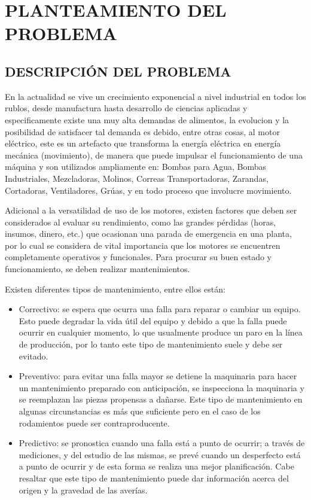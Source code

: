 \thispagestyle{empty}
\setcounter{page}{5}

\section{PLANTEAMIENTO DEL PROBLEMA}

\subsection{DESCRIPCIÓN DEL PROBLEMA}

En la actualidad se vive un crecimiento exponencial a nivel industrial en todos
los rublos, desde manufactura hasta desarrollo de ciencias aplicadas y especificamente
existe una muy alta demandas de alimentos, la evolucion y la posibilidad de
satisfacer tal demanda es debido, entre
otras cosas, al motor eléctrico, este es un artefacto que transforma la
energía eléctrica en energía mecánica (movimiento), de manera que puede
impulsar el funcionamiento de una máquina y son utilizados ampliamente en:
Bombas para Agua, Bombas Industriales, Mezcladoras, Molinos, Correas
Transportadoras, Zarandas, Cortadoras, Ventiladores, Grúas, y en todo proceso
que involucre movimiento.

Adicional a la versatilidad de uso de los motores, existen factores que deben ser
considerados al evaluar su rendimiento, como las grandes pérdidas
(horas, insumos, dinero, etc.) que ocasionan una parada
de emergencia en una planta, por lo cual se considera de vital importancia que
los motores se encuentren completamente operativos y funcionales. Para
procurar su buen estado y funcionamiento, se deben realizar mantenimientos.

Existen diferentes tipos de mantenimiento, entre ellos están:
\begin{itemize}

\item{Correctivo: se espera que ocurra una falla para reparar o cambiar un
    equipo. Esto puede degradar la vida útil del equipo y debido a que la falla
        puede ocurrir en cualquier momento, lo que usualmente produce un paro en la
        línea de producción, por lo tanto este tipo de mantenimiento suele y
        debe ser evitado.}

\item{Preventivo: para evitar una falla mayor se detiene la maquinaria para
    hacer un mantenimiento preparado con anticipación, se inspecciona la
        maquinaria y se reemplazan las piezas propensas a dañarse. Este tipo de
        mantenimiento en algunas circunstancias es más que suficiente pero en
        el caso de los rodamientos puede ser contraproducente.}

\item{Predictivo: se pronostica cuando una falla está a punto de ocurrir; a
    través de mediciones, y del estudio de las mismas, se prevé cuando un
        desperfecto está a punto de ocurrir y de esta forma se realiza una
        mejor planificación. Cabe resaltar que este tipo de mantenimiento puede
        dar información acerca del origen y la gravedad de las averías.}

\end{itemize}

